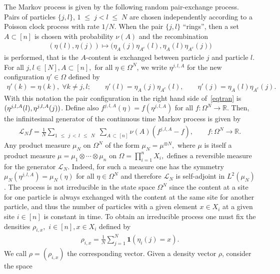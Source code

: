 \documentclass[10pt,a4paper]{amsart}
\renewcommand{\leq}{\;\leqslant\;}
\newcommand{\ind}{\mathbf{1}}
\newcommand{\cL}{\mathcal{L}}
\newcommand{\bbR}{\mathbb{R}}
\let\O=\Omega
\let\oldforall\forall
\renewcommand*{\forall}{\mathrel{\oldforall}}
\theoremstyle{definition}
\theoremstyle{plain}
\numberwithin{equation}{section}
\begin{document}
The Markov process is given by the following random pair-exchange process. Pairs of particles $\{j,l\}$, $1\leq j<l\leq N$ are chosen independently according to a Poisson clock process with rate $1/N$. When the pair $\{j,l\}$ ``rings'', then a set $A\subset[n]$ is chosen with probability $\nu(A)$ and the recombination
\begin{align}\label{eqtran}
(\eta(l),\eta(j)) \mapsto \big(\eta_A(j)\eta_{A^c}(l),\eta_A(l)\eta_{A^c}(j)\big)
\end{align}
is performed, that is the $A$-content is exchanged between particle $j$ and particle $l$. For all $j,l \in [N], A \subset [n],$ for all $\eta \in \Omega^N$, we write $\eta^{j,l,A}$ for the new configuration $\eta' \in \Omega$ defined by
\begin{align}\label{def:etajl}
\eta'(k)=\eta(k), \;\forall k \neq j,l;\qquad \eta'(l)=\eta_{A}(j)\eta_{A^c}(l),\qquad \eta'(j)=\eta_A(l)\eta_{A^c}(j).
\end{align}
With this notation the pair configuration in the right hand side of~\eqref{eqtran} is $(\eta^{j,l,A}(l),\linebreak\eta^{j,l,A}(j))$. Define also $f^{j,l,A}(\eta)=f(\eta^{j,l,A})$ for all $f:\Omega^N \rightarrow \bbR$. Then, the infinitesimal generator of the continuous time Markov process is given by
\begin{align}\label{operator}
\cL_N f = \frac{1}{N}\sum_{1\,\leq\,j\,<\,l\,\leq\,N}\;\sum_{A\,\subset\,[n]}\nu(A)\left(f^{j,l,A}-f\right), \qquad f:\Omega^N \rightarrow \bbR.
\end{align}
Any product measure $\mu_N$ on $\Omega^N$ of the form $\mu_N = \mu^{\otimes N},$ where $\mu$ is itself a product measure $\mu=\mu_1\otimes\cdots\otimes\mu_n$ on $\Omega=\prod_{i=1}^nX_i,$ defines a reversible measure for the generator $\cL_N$. Indeed, for such a measure one has the symmetry $\mu_N(\eta^{j,l,A})=\mu_N(\eta)$ for all $\eta\in\O^N$ and therefore $\cL_N$ is self-adjoint in $L^2(\mu_N)$. The process is not irreducible in the state space $\Omega^N$ since the content at a site for one particle is always exchanged with the content at the same site for another particle, and thus the number of particles with a given element $x \in X_i$ at a given site $i \in [n]$ is constant in time. To obtain an irreducible process one must fix the densities $\rho_{i,x},$ $i \in [n],x\in X_i$ defined by
\begin{align*}
\rho_{i,x} = \frac{1}{N}\sum_{j=1}^N\ind(\eta_i(j) = x).
\end{align*}
We call $\rho = (\rho_{i,x})$ the corresponding vector. Given a density vector $\rho$, consider the space
\end{document}
